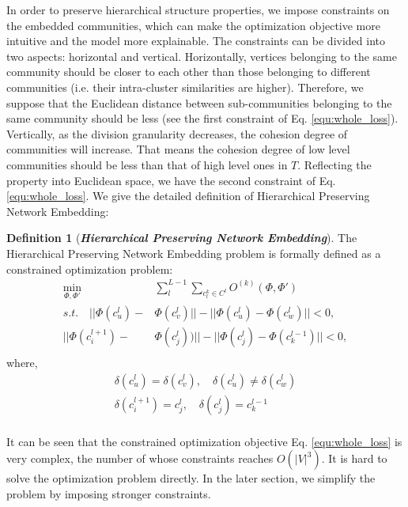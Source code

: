 \documentclass{article}
\theoremstyle{definition}
\newtheorem{defn}{Definition}
\begin{document}
		
		In order to preserve hierarchical structure properties, we impose constraints on the embedded communities, which can make the optimization objective more intuitive and the model more explainable. The constraints can be divided into two aspects: horizontal and vertical. Horizontally, vertices belonging to the same community should be closer to each other than those belonging to different communities (i.e. their intra-cluster similarities are higher). Therefore, we suppose that the Euclidean distance between sub-communities belonging to the same community should be less (see the first constraint of Eq. \ref{equ:whole_loss}). Vertically, as the division granularity decreases, the cohesion degree of communities will increase. That means the cohesion degree of low level communities should be less than that of high level ones in $T$. Reflecting the property into Euclidean space, we have the second constraint of Eq. \ref{equ:whole_loss}.
		We give the detailed definition of Hierarchical Preserving Network Embedding: 
		\begin{defn}[\textbf{\emph{Hierarchical Preserving Network Embedding}}]
			The Hierarchical Preserving Network Embedding problem is formally defined as a constrained optimization problem:
			\begin{equation}
			\label{equ:whole_loss}
			\begin{split}
			\min_{\Phi,\Phi'} & \sum_l^{L-1}\sum_{c^k_l \in C^l} O^{(k)}(\Phi, \Phi') \\
			s.t. \quad
			|| \Phi(c_u^l) - & \Phi(c_v^l) || - ||\Phi(c_u^l) - \Phi(c_w^l)|| < 0, \\
			|| \Phi(c_i^{l+1}) - & \Phi(c_j^{l})) || - ||\Phi(c_j^{l}) - \Phi(c_k^{l - 1})|| < 0,\\
			\end{split}
			\end{equation}
			where,
			\[
			\begin{split}
				\delta(c_u^l) = \delta(c_v^l), \quad \delta(c_u^l) \neq \delta(c_w^l)\\
				\delta(c_i^{l+1}) = c^l_j, \quad \delta(c^l_j) = c^{l - 1}_k \\ 
			\end{split}
			\]
		\end{defn}
	It can be seen that the constrained optimization objective Eq. \ref{equ:whole_loss} is very complex, the number of whose constraints reaches $O (|V|^3) $. It is hard to solve the optimization problem directly. In the later section, we simplify the problem by imposing stronger constraints.
	
\end{document}
